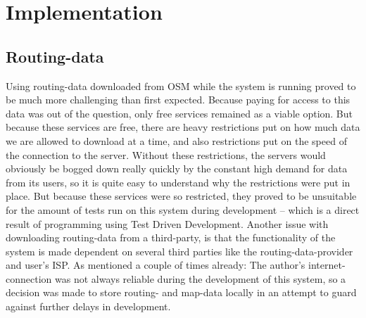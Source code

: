 \chapter{Implementation}




\section{Routing-data}
Using routing-data downloaded from OSM while the system is running proved to be much more challenging than first expected. Because paying for access to this data was out of the question, only free services remained as a viable option. But because these services are free, there are heavy restrictions put on how much data we are allowed to download at a time, and also restrictions put on the speed of the connection to the server. Without these restrictions, the servers would obviously be bogged down really quickly by the constant high demand for data from its users, so it is quite easy to understand why the restrictions were put in place. But because these services were so restricted, they proved to be unsuitable for the amount of tests run on this system during development -- which is a direct result of programming using Test Driven Development.
Another issue with downloading routing-data from a third-party, is that the functionality of the system is made dependent on several third parties like the routing-data-provider and user's ISP.
As mentioned a couple of times already: The author's internet-connection was not always reliable during the development of this system, so a decision was made to store routing- and map-data locally in an attempt to guard against further delays in development.

